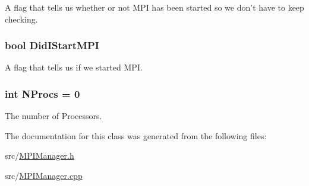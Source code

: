 A flag that tells us whether or not MPI has been started so we don't have to keep checking. \hypertarget{classJKBuilder_1_1MPIManager_a872aa5f69571aa82d846d4e359c83180}{
\subsubsection[{DidIStartMPI}]{\setlength{\rightskip}{0pt plus 5cm}bool {\bf DidIStartMPI}}}
\label{classJKBuilder_1_1MPIManager_a872aa5f69571aa82d846d4e359c83180}


A flag that tells us if we started MPI. \hypertarget{classJKBuilder_1_1MPIManager_adcb0533b7c1700c2da6b4a0b64c9c947}{
\subsubsection[{NProcs}]{\setlength{\rightskip}{0pt plus 5cm}int {\bf NProcs} = 0}}
\label{classJKBuilder_1_1MPIManager_adcb0533b7c1700c2da6b4a0b64c9c947}


The number of Processors. 

The documentation for this class was generated from the following files:\begin{DoxyCompactItemize}
\item 
src/\hyperlink{MPIManager_8h}{MPIManager.h}\item 
src/\hyperlink{MPIManager_8cpp}{MPIManager.cpp}\end{DoxyCompactItemize}
